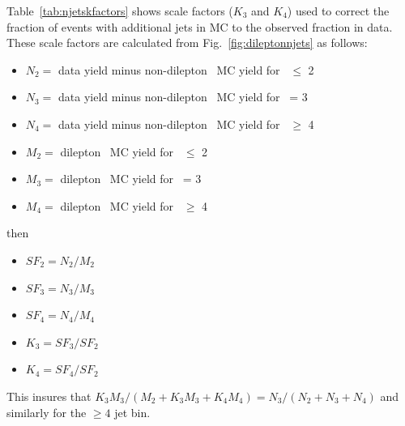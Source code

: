 

Table~\ref{tab:njetskfactors}  shows scale factors ($K_3$ and $K_4$)
used to correct the
fraction of events with additional jets in MC to the observed fraction
in data.   These scale factors are calculated from Fig.~\ref{fig:dileptonnjets} 
as follows:
\begin{itemize}
\item $N_{2}=$ data yield minus non-dilepton \ttbar\ MC yield for \njets\ $\leq$ 2
\item $N_{3}=$ data yield minus non-dilepton \ttbar\ MC yield for \njets\ = 3
\item $N_{4}=$ data yield minus non-dilepton \ttbar\ MC yield for \njets\ $\geq$ 4
\item $M_{2}=$ dilepton \ttbar\ MC yield for \njets\ $\leq$ 2
\item $M_{3}=$ dilepton \ttbar\ MC yield for \njets\ = 3
\item $M_{4}=$ dilepton \ttbar\ MC yield for \njets\ $\geq$ 4
\end{itemize}
\noindent then
\begin{itemize}
\item $SF_2 = N_2 / M_2$
\item $SF_3 = N_3 / M_3$
\item $SF_4 = N_4 / M_4$
\item $K_3 = SF_3 / SF_2$
\item $K_4 = SF_4 / SF_2$
\end{itemize}
\noindent This insures that $K_3 M_3/(M_2 + K_3 M_3 + K_4 M_4) = N_3 /
(N_2+N_3+N_4)$ and similarly for the $\geq 4$ jet bin.

